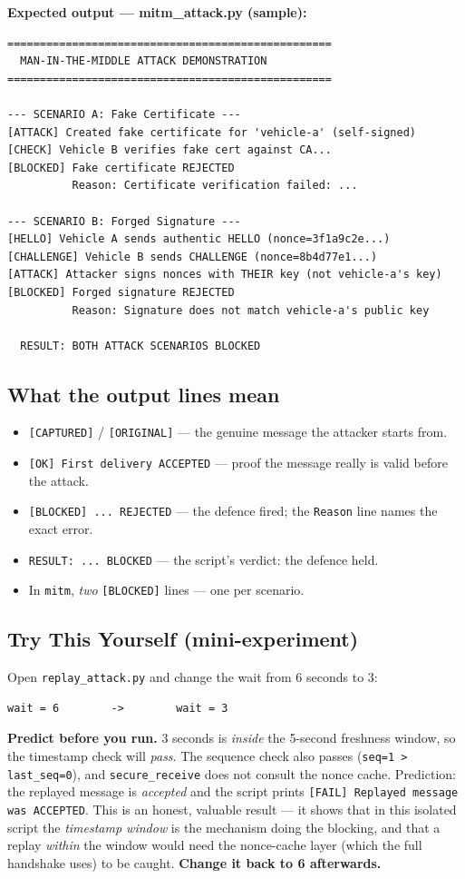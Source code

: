 \documentclass[11pt,a4paper]{article}
\begin{document}
\noindent\textbf{Expected output --- mitm\_attack.py (sample):}
\begin{lstlisting}[style=term]
==================================================
  MAN-IN-THE-MIDDLE ATTACK DEMONSTRATION
==================================================

--- SCENARIO A: Fake Certificate ---
[ATTACK] Created fake certificate for 'vehicle-a' (self-signed)
[CHECK] Vehicle B verifies fake cert against CA...
[BLOCKED] Fake certificate REJECTED
          Reason: Certificate verification failed: ...

--- SCENARIO B: Forged Signature ---
[HELLO] Vehicle A sends authentic HELLO (nonce=3f1a9c2e...)
[CHALLENGE] Vehicle B sends CHALLENGE (nonce=8b4d77e1...)
[ATTACK] Attacker signs nonces with THEIR key (not vehicle-a's key)
[BLOCKED] Forged signature REJECTED
          Reason: Signature does not match vehicle-a's public key

  RESULT: BOTH ATTACK SCENARIOS BLOCKED
\end{lstlisting}

\subsection{What the output lines mean}
\begin{itemize}
  \item \texttt{[CAPTURED]} / \texttt{[ORIGINAL]} --- the genuine message the
        attacker starts from.
  \item \texttt{[OK] First delivery ACCEPTED} --- proof the message really is
        valid before the attack.
  \item \texttt{[BLOCKED] ... REJECTED} --- the defence fired; the
        \texttt{Reason} line names the exact error.
  \item \texttt{RESULT: ... BLOCKED} --- the script's verdict: the defence held.
  \item In \texttt{mitm}, \emph{two} \texttt{[BLOCKED]} lines --- one per scenario.
\end{itemize}

\subsection{Try This Yourself (mini-experiment)}
Open \texttt{replay\_attack.py} and change the wait from 6 seconds to 3:
\begin{lstlisting}[style=term]
wait = 6        ->        wait = 3
\end{lstlisting}
\textbf{Predict before you run.} 3 seconds is \emph{inside} the 5-second freshness
window, so the timestamp check will \emph{pass}. The sequence check also passes
(\texttt{seq=1 > last\_seq=0}), and \texttt{secure\_receive} does not consult the
nonce cache. Prediction: the replayed message is \emph{accepted} and the script
prints \texttt{[FAIL] Replayed message was ACCEPTED}. This is an honest, valuable
result --- it shows that in this isolated script the \emph{timestamp window} is
the mechanism doing the blocking, and that a replay \emph{within} the window
would need the nonce-cache layer (which the full handshake uses) to be caught.
\textbf{Change it back to 6 afterwards.}
\end{document}
